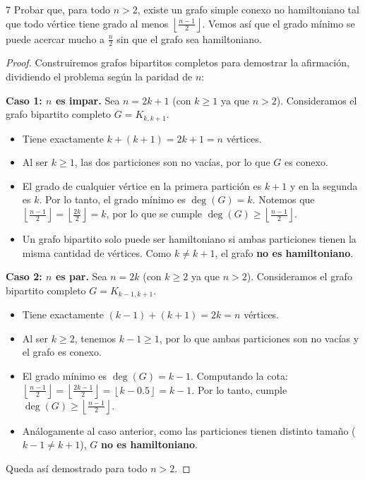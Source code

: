 \begin{ejercicio}{7}
    Probar que, para todo \(n > 2\), existe un grafo simple conexo no hamiltoniano tal que todo vértice tiene grado al menos \(\left\lfloor \frac{n-1}{2} \right\rfloor\). Vemos así que el grado mínimo se puede acercar mucho a \(\frac{n}{2}\) sin que el grafo sea hamiltoniano.
\end{ejercicio}
\begin{proof}
    Construiremos grafos bipartitos completos para demostrar la afirmación, dividiendo el problema según la paridad de \(n\):

    \textbf{Caso 1: \(n\) es impar.} Sea \(n = 2k + 1\) (con \(k \geq 1\) ya que \(n > 2\)).
    Consideramos el grafo bipartito completo \(G = K_{k, k+1}\).
    \begin{itemize}
        \item Tiene exactamente \(k + (k+1) = 2k + 1 = n\) vértices.
        \item Al ser \(k \ge 1\), las dos particiones son no vacías, por lo que \(G\) es conexo.
        \item El grado de cualquier vértice en la primera partición es \(k+1\) y en la segunda es \(k\). Por lo tanto, el grado mínimo es \(\deg(G) = k\). Notemos que \(\left\lfloor \frac{n-1}{2} \right\rfloor = \left\lfloor \frac{2k}{2} \right\rfloor = k\), por lo que se cumple \(\deg(G) \ge \left\lfloor \frac{n-1}{2} \right\rfloor \).
        \item Un grafo bipartito solo puede ser hamiltoniano si ambas particiones tienen la misma cantidad de vértices. Como \(k \neq k+1\), el grafo \textbf{no es hamiltoniano}.
    \end{itemize}

    \textbf{Caso 2: \(n\) es par.} Sea \(n = 2k\) (con \(k \geq 2\) ya que \(n > 2\)).
    Consideramos el grafo bipartito completo \(G = K_{k-1, k+1}\).
    \begin{itemize}
        \item Tiene exactamente \((k-1) + (k+1) = 2k = n\) vértices.
        \item Al ser \(k \ge 2\), tenemos \(k-1 \ge 1\), por lo que ambas particiones son no vacías y el grafo es conexo.
        \item El grado mínimo es \(\deg(G) = k-1\). Computando la cota: \(\left\lfloor \frac{n-1}{2} \right\rfloor = \left\lfloor \frac{2k-1}{2} \right\rfloor = \left\lfloor k - 0.5 \right\rfloor = k - 1\). Por lo tanto, cumple \(\deg(G) \ge \left\lfloor \frac{n-1}{2} \right\rfloor \).
        \item Análogamente al caso anterior, como las particiones tienen distinto tamaño (\(k-1 \neq k+1\)), \(G\) \textbf{no es hamiltoniano}.
    \end{itemize}
    Queda así demostrado para todo \(n>2\).
\end{proof}

